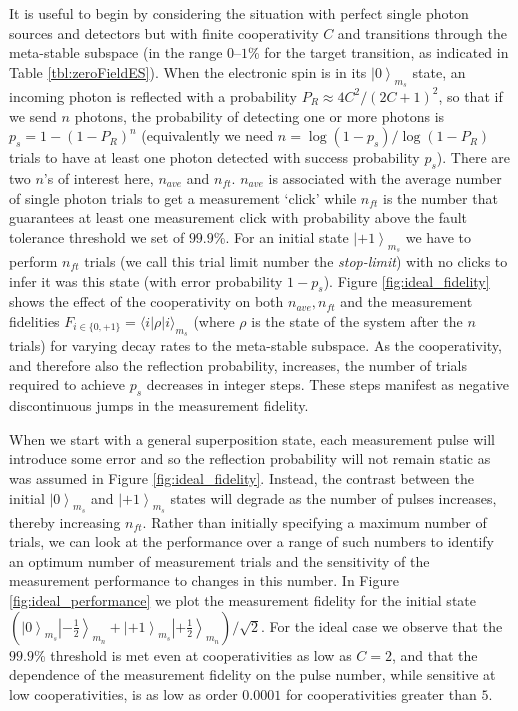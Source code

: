 \documentclass[aps,pra,amsmath,amssymb,reprint,superscriptaddress,tightenlines]{revtex4-1}
\begin{document}
It is useful to begin by considering the situation with perfect single photon sources and detectors but with finite cooperativity $C$ and transitions through the meta-stable subspace (in the range $0$--$1$\% for the target transition, as indicated in Table \ref{tbl:zeroFieldES}). When the electronic spin is in its $\left| 0 \right>_{m_{s}}$ state, an incoming photon is reflected with a probability {$P_{R} \approx 4 C^2 / (2 C+1)^{2}$}, so that if we send $n$ photons, the probability of detecting one or more photons is $p_{s} = 1-\left(1-P_R\right)^n$ (equivalently we need $n = \log (1-p_{s}) / \log (1-P_{R})$ trials to have at least one photon detected with success probability $p_{s}$). There are two $n$'s of interest here,  $n_{ave}$ and $n_{ft}$. $n_{ave}$ is associated with the average number of single photon trials to get a measurement `click' while  $n_{ft}$ is the number that guarantees at least one measurement click with probability above the fault tolerance threshold we set of $99.9$\%. For an initial state $\left| +1 \right>_{m_{s}}$ we have to perform $n_{ft}$ trials (we call this trial limit number the {\it stop-limit}) with no clicks to infer it was this state (with error probability $1- p_{s}$). Figure \ref{fig:ideal_fidelity} shows the effect of the cooperativity on both $n_{ave}, n_{ft}$ and the measurement fidelities $F_{i \in \{0,+1\}}=\langle i| \rho | i \rangle_{m_{s}}$ (where $\rho$ is the state of the system after the $n$ trials) for varying decay rates to the meta-stable subspace. As the cooperativity, and therefore also the reflection probability, increases, the number of trials required to achieve $p_{s}$ decreases in integer steps. These steps manifest as negative discontinuous jumps in the measurement fidelity.

When we start with a general superposition state, each measurement pulse will introduce some error and so the reflection probability will not remain static as was assumed in Figure \ref{fig:ideal_fidelity}. Instead, the contrast between the initial $\left| 0 \right>_{m_{s}}$ and $\left| +1 \right>_{m_{s}}$ states will degrade as the number of pulses increases, thereby increasing $n_{ft}$.
Rather than initially specifying a maximum number of trials, we can look at the performance over a range of such numbers to identify an optimum number of measurement trials and the sensitivity of the measurement performance to changes in this number.
In Figure \ref{fig:ideal_performance} we plot the measurement fidelity for the initial state $\left( \left| 0 \right>_{m_{s}} \left| -\frac{1}{2} \right>_{m_{n}} + \left| +1 \right>_{m_{s}} \left| +\frac{1}{2} \right>_{m_{n}} \right) / \sqrt{2}$. For the ideal case we observe that the $99.9$\% threshold is met even at cooperativities as low as $C = 2$, and that the dependence of the measurement fidelity on the pulse number, while sensitive at low cooperativities, is as low as order $0.0001$ for cooperativities greater than $5$.
\end{document}
